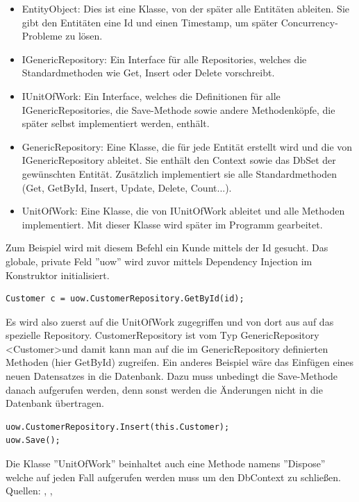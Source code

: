 \begin{itemize}
\item EntityObject: Dies ist eine Klasse, von der später alle Entitäten ableiten. Sie gibt den Entitäten eine Id und einen Timestamp, um später Concurrency-Probleme zu lösen.
\item IGenericRepository: Ein Interface für alle Repositories, welches die Standardmethoden wie Get, Insert oder Delete vorschreibt.
\item IUnitOfWork: Ein Interface, welches die Definitionen für alle IGenericRepositories, die Save-Methode sowie andere Methodenköpfe, die später selbst implementiert werden, enthält.
\item GenericRepository: Eine Klasse, die für jede Entität erstellt wird und die von IGenericRepository ableitet. Sie enthält den Context sowie das DbSet der gewünschten Entität. Zusätzlich implementiert sie alle Standardmethoden (Get, GetById, Insert, Update, Delete, Count...).
\item UnitOfWork: Eine Klasse, die von IUnitOfWork ableitet und alle Methoden implementiert. Mit dieser Klasse wird später im Programm gearbeitet. 
\end{itemize}
Zum Beispiel wird mit diesem Befehl ein Kunde mittels der Id gesucht. Das globale, private Feld ''uow'' wird zuvor mittels Dependency Injection im Konstruktor initialisiert.
\begin{lstlisting}
Customer c = uow.CustomerRepository.GetById(id);
\end{lstlisting}
Es wird also zuerst auf die UnitOfWork zugegriffen und von dort aus auf das spezielle Repository. CustomerRepository ist vom Typ GenericRepository \textless Customer\textgreater  und damit kann man auf die im GenericRepository definierten Methoden (hier GetById) zugreifen.
\newline
Ein anderes Beispiel wäre das Einfügen eines neuen Datensatzes in die Datenbank. Dazu muss unbedingt die Save-Methode danach aufgerufen werden, denn sonst werden die Änderungen nicht in die Datenbank übertragen.
\begin{lstlisting}
uow.CustomerRepository.Insert(this.Customer);
uow.Save();
\end{lstlisting}
Die Klasse ''UnitOfWork'' beinhaltet auch eine Methode namens ''Dispose'' welche auf jeden Fall aufgerufen werden muss um den DbContext zu schließen.
\newline Quellen: \cite{codeproject_unit_2018}, \cite{dofactory_.net_2018}, \cite{c-sharpcorner_unit_2018}
